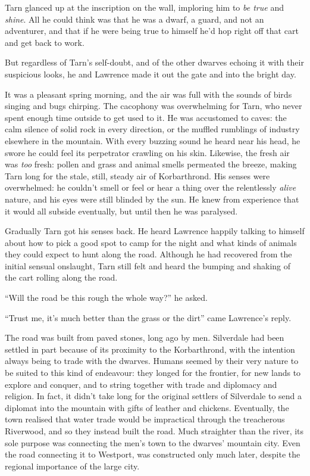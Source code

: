 Tarn glanced up at the inscription on the wall, imploring him to \emph{be true} and \emph{shine}.  All he could think was that he was a dwarf, a guard, and not an adventurer, and that if he were being true to himself he'd hop right off that cart and get back to work.  

But regardless of Tarn's self-doubt, and of the other dwarves echoing it with their suspicious looks, he and Lawrence made it out the gate and into the bright day.

It was a pleasant spring morning, and the air was full with the sounds of birds singing and bugs chirping.  The cacophony was overwhelming for Tarn, who never spent enough time outside to get used to it.  He was accustomed to caves: the calm silence of solid rock in every direction, or the muffled rumblings of industry elsewhere in the mountain.  With every buzzing sound he heard near his head, he swore he could feel its perpetrator crawling on his skin.  Likewise, the fresh air was \emph{too} fresh: pollen and grass and animal smells permeated the breeze, making Tarn long for the stale, still, steady air of Korbarthrond.  His senses were overwhelmed: he couldn't smell or feel or hear a thing over the relentlessly \emph{alive} nature, and his eyes were still blinded by the sun.  He knew from experience that it would all subside eventually, but until then he was paralysed.

Gradually Tarn got his senses back.  He heard Lawrence happily talking to himself about how to pick a good spot to camp for the night and what kinds of animals they could expect to hunt along the road.  Although he had recovered from the initial sensual onslaught, Tarn still felt and heard the bumping and shaking of the cart rolling along the road.

``Will the road be this rough the whole way?'' he asked.

``Trust me, it's much better than the grass or the dirt'' came Lawrence's reply.

The road was built from paved stones, long ago by men.  Silverdale had been settled in part because of its proximity to the Korbarthrond, with the intention always being to trade with the dwarves.  Humans seemed by their very nature to be suited to this kind of endeavour: they longed for the frontier, for new lands to explore and conquer, and to string together with trade and diplomacy and religion.  In fact, it didn't take long for the original settlers of Silverdale to send a diplomat into the mountain with gifts of leather and chickens.  Eventually, the town realised that water trade would be impractical through the treacherous Riverwood, and so they instead built the road.  Much straighter than the river, its sole purpose was connecting the men's town to the dwarves' mountain city.  Even the road connecting it to Westport, was constructed only much later, despite the regional importance of the large city.

